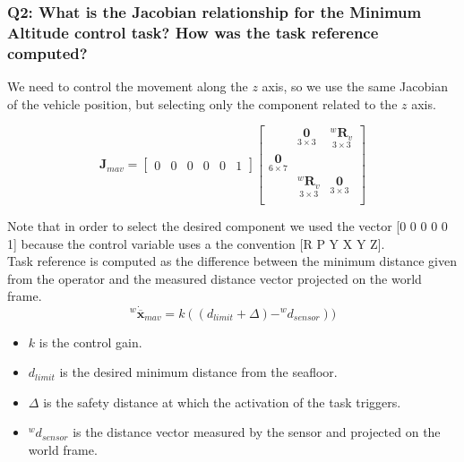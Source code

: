 \documentclass{article}
\begin{document}
\subsubsection{Q2: What is the Jacobian relationship for the Minimum Altitude control task? How was the task reference computed?}
We need to control the movement along the $z$ axis, so we use the same Jacobian of the vehicle position, but selecting only the component related to the $z$ axis.

\begin{equation}
\boldsymbol{J}_{mav}=\begin{bmatrix} 0 & 0 & 0 & 0 & 0 & 1
\end{bmatrix}
    \begin{bmatrix}
     & \underset{3\times 3}{\boldsymbol{0}} & \underset{ 3\times 3}{^{w}\boldsymbol{R}_{v}} \\
     \underset{ 6\times 7}{\boldsymbol{0}} \\
     & \underset{ 3\times 3}{^{w}\boldsymbol{R}_{v}} & \underset{3\times 3}{\boldsymbol{0}} \\
    \end{bmatrix}
\end{equation}

Note that in order to select the desired component we used the vector [0 0 0 0 0 1] because the control variable uses a the convention [R P Y X Y Z].\\
Task reference is computed as the difference between the minimum distance given from the operator and the measured distance vector projected on the world frame.
\begin{equation}
    ^{w}\dot{\overline{\boldsymbol{x}}}_{mav} = k((d_{limit}+\Delta)- ^w d_{sensor})) %
\end{equation}
\begin{itemize}
    \item $k$ is the control gain.
    \item $d_{limit}$ is the desired minimum distance from the seafloor.
    \item $ \Delta $ is the safety distance at which the activation of the task triggers.
    \item $^w d_{sensor}$ is the distance vector measured by the sensor and projected on the world frame.
\end{itemize} 
\end{document}
